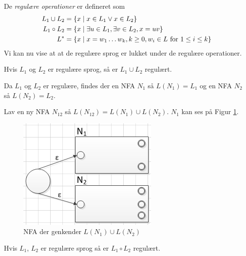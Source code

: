 \documentclass[a4paper,10pt,article]{memoir}
\begin{document}
De \emph{regulære operationer} er defineret som
%
\begin{align*}
L_1 \cup L_2 &= \{ x \mid  x \in L_1 \lor x \in L_2 \} \\
L_1 \circ L_2 & = \{ x \mid  \exists u \in L_1, \exists v \in L_2, x = uv  \} \\
L^{\ast} & = \{ x \mid  x = w_1 \ldots w_k, k \geq 0, w_i \in L \text{ for } 1 \leq i \leq k \}
\end{align*}
%
Vi kan nu vise at at de regulære sprog er lukket under de regulære operationer.

\begin{saetning}
Hvis $L_1$ og $L_2$ er regulære sprog, så er $L_1 \cup L_2$ regulært.
\end{saetning}
\begin{bevis}
Da $L_1$ og $L_2$ er regulære, findes der en NFA $N_1$ så $L(N_1) = L_1$ og en NFA $N_2$ så $L(N_2) = L_2$.

Lav en ny NFA $N_12$ så $L(N_12) = L(N_1) \cup L(N_2)$. $N_1$ kan ses på Figur \ref{fig:9}.


\begin{figure}[h]
\centering
\includegraphics[scale=0.8]{figur9.png}
\caption{NFA der genkender $L(N_1) \cup L(N_2)$}
\label{fig:9}
\end{figure}

\end{bevis}

\begin{saetning}
Hvis $L_1$, $L_2$ er regulære sprog så er $L_1 \circ L_2$ regulært.
\end{saetning}
\end{document}
